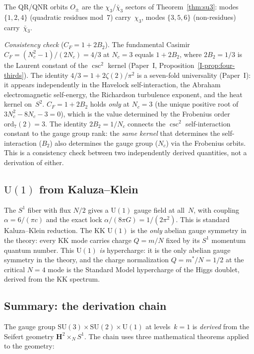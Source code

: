 The QR/QNR orbits $O_\pm$ are the
$\chi_3$/$\bar\chi_3$ sectors of Theorem~\ref{thm:su3}:
modes $\{1,2,4\}$ (quadratic residues mod~$7$) carry~$\chi_3$,
modes $\{3,5,6\}$ (non-residues) carry~$\bar{\chi}_3$.

\emph{Consistency check} ($C_F = 1 + 2B_2$).
The fundamental Casimir $C_F = (N_c^2{-}1)/(2N_c) = 4/3$ at $N_c = 3$
equals $1 + 2B_2$, where $2B_2 = 1/3$ is the Laurent constant of
the $\csc^2$ kernel
(Paper~I, Proposition~\ref*{I-prop:four-thirds}).
The identity $4/3 = 1 + 2\zeta(2)/\pi^2$ is a
seven-fold universality (Paper~I): it appears independently
in the Havelock self-interaction, the Abraham electromagnetic
self-energy, the Richardson turbulence exponent, and the
heat kernel on~$S^2$.
$C_F = 1 + 2B_2$ holds
\emph{only} at $N_c = 3$ (the unique positive root of
$3N_c^2 - 8N_c - 3 = 0$), which is the value
determined by the Frobenius order $\mathrm{ord}_7(2) = 3$.
The identity $2B_2 = 1/N_c$ connects the $\csc^2$
self-interaction constant to the gauge group rank:
the \emph{same kernel} that determines the self-interaction
($B_2$) also determines the gauge group ($N_c$) via the
Frobenius orbits.
This is a consistency check between two independently derived
quantities, not a derivation of either.

\subsection{$\mathrm{U}(1)$ from Kaluza--Klein}

The $S^1$ fiber with flux $N/2$ gives a $\mathrm{U}(1)$ gauge field
at all~$N$, with coupling $\alpha = 6/(\pi c)$ and the exact lock
$\alpha/(8\pi G) = 1/(2\pi^2)$.
This is standard Kaluza--Klein reduction.
The KK $\mathrm{U}(1)$ is the \emph{only} abelian gauge
symmetry in the theory: every KK mode carries charge
$Q = m/N$ fixed by its $S^1$ momentum quantum number.
This $\mathrm{U}(1)$ \emph{is} hypercharge:
it is the only abelian gauge symmetry
in the theory, and the charge normalization $Q = m^*/N = 1/2$
at the critical $N = 4$ mode is the Standard Model
hypercharge of the Higgs doublet, derived from the
KK spectrum.

\subsection{Summary: the derivation chain}
\label{sec:gauge-derivation-chain}

The gauge group $\mathrm{SU}(3) \times \mathrm{SU}(2) \times \mathrm{U}(1)$
at levels~$k = 1$ is \emph{derived} from the Seifert geometry
$\mathbf{H}^2 \times_N S^1$.
The chain uses three mathematical theorems applied to the geometry:

